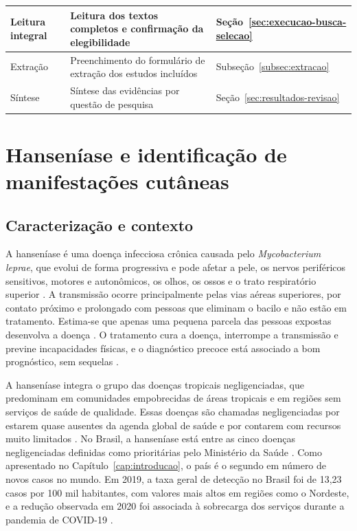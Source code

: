 \begin{longtable}{|>{\footnotesize\raggedright\arraybackslash}p{2.8cm}|>{\footnotesize\raggedright\arraybackslash}p{4.9cm}|>{\footnotesize\raggedright\arraybackslash}p{5.5cm}|}
		Leitura integral               & Leitura dos textos completos e confirmação da elegibilidade                                      & Seção~\ref{sec:execucao-busca-selecao}                                                         \\ \hline
		Extração                       & Preenchimento do formulário de extração dos estudos incluídos                                    & Subseção~\ref{subsec:extracao}                                                                 \\ \hline
		Síntese                        & Síntese das evidências por questão de pesquisa                                                   & Seção~\ref{sec:resultados-revisao}                                                             \\ \hline
\end{longtable}
\endgroup
{}

\section{Hanseníase e identificação de manifestações cutâneas}

\subsection{Caracterização e contexto}

A hanseníase é uma doença infecciosa crônica causada pelo
\textit{Mycobacterium leprae}, que evolui de forma progressiva e pode afetar a
pele, os nervos periféricos sensitivos, motores e autonômicos, os olhos, os
ossos e o trato respiratório superior \cite{fernandes2024,lima2024skin}. A
transmissão ocorre principalmente pelas vias aéreas superiores, por contato
próximo e prolongado com pessoas que eliminam o bacilo e não estão em
tratamento. Estima-se que apenas uma pequena parcela das pessoas expostas
desenvolva a doença \cite{fernandes2024}. O tratamento cura a doença,
interrompe a transmissão e previne incapacidades físicas, e o diagnóstico
precoce está associado a bom prognóstico, sem sequelas \cite{lima2024skin}.

A hanseníase integra o grupo das doenças tropicais negligenciadas, que
predominam em comunidades empobrecidas de áreas tropicais e em regiões sem
serviços de saúde de qualidade. Essas doenças são chamadas negligenciadas por
estarem quase ausentes da agenda global de saúde e por contarem com recursos
muito limitados \cite{oms2025dtn}. No Brasil, a hanseníase está entre as cinco
doenças negligenciadas definidas como prioritárias pelo Ministério da Saúde
\cite{lima2024skin}. Como apresentado no Capítulo~\ref{cap:introducao}, o país é o segundo em número de novos casos no mundo. Em 2019,
a taxa geral de detecção no Brasil foi de 13,23 casos por 100 mil habitantes,
com valores mais altos em regiões como o Nordeste, e a redução observada em
2020 foi associada à sobrecarga dos serviços durante a pandemia de COVID-19
\cite{lima2024skin}.


